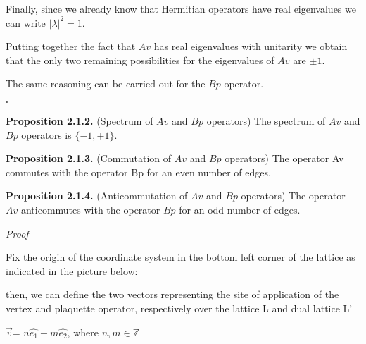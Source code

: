 \documentclass[12pt]{report}
\begin{document}
\begin{minipage}{1\textwidth}
		Finally, since we already know that Hermitian operators have real eigenvalues we can write $|\lambda|^2 = 1$.\newline
		
		Putting together the fact that $Av$ has real eigenvalues with unitarity we obtain that the only two remaining possibilities for the eigenvalues of $Av$ are $\pm 1$. \newline
		
		The same reasoning can be carried out for the $Bp$ operator.
		
		\hfill $\square$
		
		
	\end{minipage}
	
	\begin{minipage}{1\textwidth}
		
		
		\textbf{Proposition 2.1.2.} (Spectrum of $Av$ and $Bp$ operators) The spectrum of $Av$ and $Bp$ operators is $\{-1,+1\}$. \newline
		
		
		\textbf{Proposition 2.1.3.} (Commutation of $Av$ and $Bp$ operators) The operator Av commutes with the operator Bp for an even number of edges.
		\newline
		
		\textbf{Proposition 2.1.4.} (Anticommutation of $Av$ and $Bp$ operators) The operator $Av$ anticommutes with the operator $Bp$ for an odd number of edges.
		\newline
		
		\textit{Proof}\newline 
		
		Fix the origin of the coordinate system in the bottom left corner of the lattice as indicated in the picture below:\newline
		
		
		then, we can define the two vectors representing the site of application of the vertex and plaquette operator, respectively over the lattice L and dual lattice L'
		
		\begin{center}
			$\vec{v}$= $n\hat{e_1} + m\hat{e_2}$, where $n,m \in \mathbb{Z}$ \newline
			

\end{center}
\end{minipage}
\end{document}
